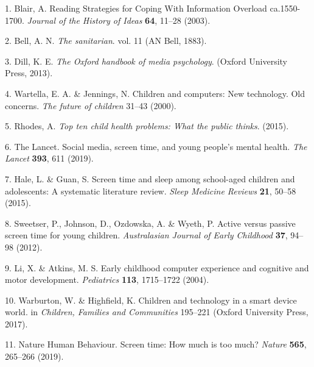 \documentclass[
  english,
  man]{apa6}
\newenvironment{cslreferences}%
  {}%
  {\par}
\begin{document}
\hypertarget{refs}{}
\begin{cslreferences}
\leavevmode\hypertarget{ref-blairReadingStrategiesCoping2003}{}%
1. Blair, A. Reading Strategies for Coping With Information Overload ca.1550-1700. \emph{Journal of the History of Ideas} \textbf{64}, 11--28 (2003).

\leavevmode\hypertarget{ref-bell1883sanitarian}{}%
2. Bell, A. N. \emph{The sanitarian}. vol. 11 (AN Bell, 1883).

\leavevmode\hypertarget{ref-dill2013oxford}{}%
3. Dill, K. E. \emph{The Oxford handbook of media psychology}. (Oxford University Press, 2013).

\leavevmode\hypertarget{ref-wartellaChildrenComputersNew2000}{}%
4. Wartella, E. A. \& Jennings, N. Children and computers: New technology. Old concerns. \emph{The future of children} 31--43 (2000).

\leavevmode\hypertarget{ref-rhodes2015top}{}%
5. Rhodes, A. \emph{Top ten child health problems: What the public thinks}. (2015).

\leavevmode\hypertarget{ref-thelancetSocialMediaScreen2019}{}%
6. The Lancet. Social media, screen time, and young people's mental health. \emph{The Lancet} \textbf{393}, 611 (2019).

\leavevmode\hypertarget{ref-haleScreenTimeSleep2015}{}%
7. Hale, L. \& Guan, S. Screen time and sleep among school-aged children and adolescents: A systematic literature review. \emph{Sleep Medicine Reviews} \textbf{21}, 50--58 (2015).

\leavevmode\hypertarget{ref-sweetserActivePassiveScreen2012}{}%
8. Sweetser, P., Johnson, D., Ozdowska, A. \& Wyeth, P. Active versus passive screen time for young children. \emph{Australasian Journal of Early Childhood} \textbf{37}, 94--98 (2012).

\leavevmode\hypertarget{ref-liEarlyChildhoodComputer2004}{}%
9. Li, X. \& Atkins, M. S. Early childhood computer experience and cognitive and motor development. \emph{Pediatrics} \textbf{113}, 1715--1722 (2004).

\leavevmode\hypertarget{ref-warburton2017children}{}%
10. Warburton, W. \& Highfield, K. Children and technology in a smart device world. in \emph{Children, Families and Communities} 195--221 (Oxford University Press, 2017).

\leavevmode\hypertarget{ref-naturehumanbehaviourScreenTimeHow2019}{}%
11. Nature Human Behaviour. Screen time: How much is too much? \emph{Nature} \textbf{565}, 265--266 (2019).


\end{cslreferences}
\end{document}
